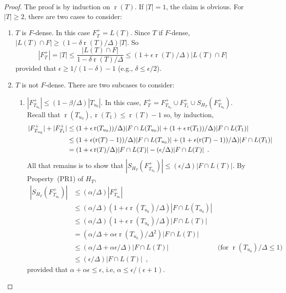 \documentclass{patmorin}
\DeclareMathOperator{\rank}{r}
\begin{document}
\begin{proof}
  The proof is by induction on $\rank(T)$. If $|T|=1$, the claim is
  obvious. For $|T|\ge 2$, there are two cases to consider:
  \begin{enumerate}
    \item $T$ is $F$-dense. In this case $F^+_T=L(T)$.  
     Since $T$ if $F$-dense,  $|L(T)\cap F|\ge
     (1-\delta\rank(T)/\Delta)|T|$.  So
     \[
       |F^+_T|=|T|
	  \le \frac{|L(T)\cap F|}{1-\delta\rank(T)/\Delta} 
          \le (1+\epsilon\rank(T)/\Delta)|L(T)\cap F|
     \]
     provided that $\epsilon \ge 1/(1-\delta)-1$ (e.g., $\delta\le \epsilon/2$).

    \item $T$ is not $F$-dense. There are two subcases to consider:
    \begin{enumerate}
       \item $|F^+_{T_{u_0}}| \le (1-\beta/\Delta)|T_{u_0}|$.
         In this case, $F^+_T=F^+_{T_{u_0}}\cup F^+_{T_1} \cup S_{H_T}(F^+_{T_{u_0}})$.
         Recall that
        $\rank(T_{u_0}),\rank(T_1)\le\rank(T)-1$ so, by induction,
         \begin{align}
              |F^+_{T_{u_0}}| + |F^+_{T_{1}}| 
              & \le (1+\epsilon\rank(T_{u_0}))/\Delta)|F\cap L(T_{u_0})| 
                    +(1+\epsilon\rank(T_{1}))/\Delta)|F\cap L(T_{1})| \notag \\
              & \le (1+\epsilon(\rank(T)-1))/\Delta)|F\cap L(T_{u_0})| 
                    +(1+\epsilon(\rank(T)-1))/\Delta)|F\cap L(T_{1})|  \notag \\
              & = (1+\epsilon\rank(T)/\Delta)|F\cap L(T)| - (\epsilon/\Delta)|F\cap L(T)| \enspace .
            \eqlabel{inductio}
         \end{align}
         All that remains is to show that $|S_{H_T}(F^+_{T_{u_0}})|\le
         (\epsilon/\Delta)|F\cap L(T)|$. By Property~(PR1) of $H_T$,
          \begin{align*}
          |S_{H_T}(F^+_{T_{u_0}})| 
            & \le (\alpha/\Delta)|F^+_{T_{u_0}}| \\
            & \le (\alpha/\Delta)(1+\epsilon\rank(T_{u_0})/\Delta)|F\cap L(T_{u_0})| \\
            & \le (\alpha/\Delta)(1+\epsilon\rank(T_{u_0})/\Delta)|F\cap L(T)|\\
            & = (\alpha/\Delta+\alpha\epsilon\rank(T_{u_0})/\Delta^2)|F\cap L(T)| \\
            & \le (\alpha/\Delta+\alpha\epsilon/\Delta)|F\cap L(T)| 
    	     & \text{(for $\rank(T_{u_0})/\Delta\le 1$)} \\
    	& \le (\epsilon/\Delta)|F\cap L(T)| \enspace ,
       \end{align*}
       provided that $\alpha+\alpha\epsilon \le \epsilon$, i.e, 
       $\alpha \le \epsilon/(\epsilon+1)$.   


\end{enumerate}
\end{enumerate}
\end{proof}
\end{document}
